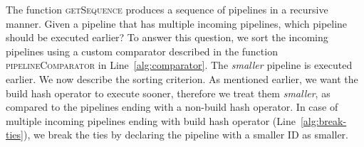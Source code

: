 The function \textsc{getSequence} produces a sequence of pipelines in a recursive manner.
Given a pipeline that has multiple incoming pipelines, which pipeline should be executed earlier?
To answer this question, we sort the incoming pipelines using a custom comparator described in the function \textsc{pipelineComparator} in Line~\ref{alg:comparator}.
The \textit{smaller} pipeline is executed earlier. 
We now describe the sorting criterion.
As mentioned earlier, we want the build hash operator to execute sooner, therefore we treat them \textit{smaller}, as compared to the pipelines ending with a non-build hash operator.
In case of multiple incoming pipelines ending with build hash operator (Line~\ref{alg:break-ties}), we break the ties by declaring the pipeline with a smaller ID as smaller.
